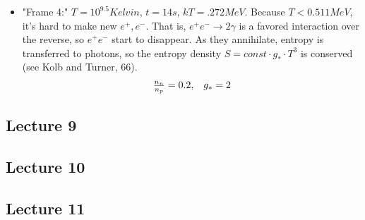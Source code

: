 \documentclass{article}
\begin{document}
\begin{itemize}
\item"Frame 4:" $T=10^{9.5} Kelvin$, $t=14s$, $kT=.272MeV$.  Because
$T<0.511MeV$, it's hard to make new $e^+,e^-$.  That is, $e^+e^-\to 2\gamma$
is a favored interaction over the reverse, so $e^+e^-$ start to disappear.
As they annihilate, entropy is transferred to photons, so the entropy density
$S=const\cdot g_*\cdot T^3$ is conserved (see Kolb and Turner, 66).
$$\begin{matrix} {n_n\over n_p}=0.2,& g_*=2\end{matrix}$$
\end{itemize}


\subsection{Lecture 9}

\subsection{Lecture 10}

\subsection{Lecture 11}
\end{document}
